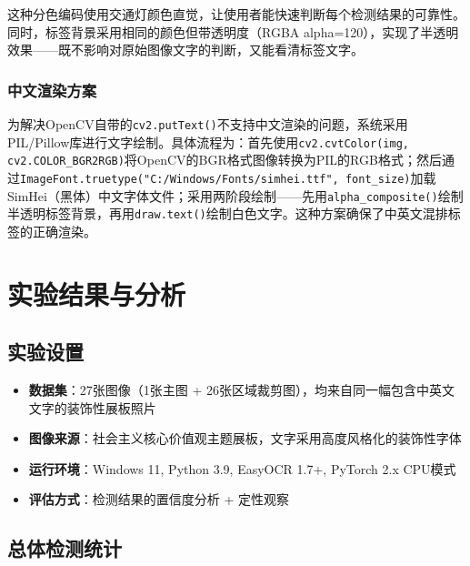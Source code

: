 \documentclass[12pt,hyperref,a4paper,UTF8]{ctexart}
\begin{document}
这种分色编码使用交通灯颜色直觉，让使用者能快速判断每个检测结果的可靠性。同时，标签背景采用相同的颜色但带透明度（RGBA alpha=120），实现了半透明效果——既不影响对原始图像文字的判断，又能看清标签文字。

\subsubsection{中文渲染方案}

为解决OpenCV自带的\texttt{cv2.putText()}不支持中文渲染的问题，系统采用PIL/Pillow库进行文字绘制。具体流程为：首先使用\texttt{cv2.cvtColor(img, cv2.COLOR\_BGR2RGB)}将OpenCV的BGR格式图像转换为PIL的RGB格式；然后通过\texttt{ImageFont.truetype("C:/Windows/Fonts/simhei.ttf", font\_size)}加载SimHei（黑体）中文字体文件；采用两阶段绘制——先用\texttt{alpha\_composite()}绘制半透明标签背景，再用\texttt{draw.text()}绘制白色文字。这种方案确保了中英文混排标签的正确渲染。

\clearpage

\section{实验结果与分析}

\subsection{实验设置}

\begin{itemize}
    \item \textbf{数据集}：27张图像（1张主图 + 26张区域裁剪图），均来自同一幅包含中英文文字的装饰性展板照片
    \item \textbf{图像来源}：社会主义核心价值观主题展板，文字采用高度风格化的装饰性字体
    \item \textbf{运行环境}：Windows 11, Python 3.9, EasyOCR 1.7+, PyTorch 2.x CPU模式
    \item \textbf{评估方式}：检测结果的置信度分析 + 定性观察
\end{itemize}

\subsection{总体检测统计}
\end{document}
